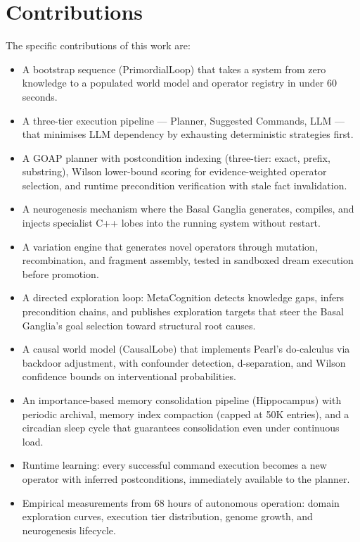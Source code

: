 \documentclass[12pt,a4paper]{report}
\begin{document}
\section{Contributions}
The specific contributions of this work are:
\begin{itemize}
    \item A bootstrap sequence (PrimordialLoop) that takes a system from zero knowledge to a populated world model and operator registry in under 60 seconds.
    \item A three-tier execution pipeline --- Planner, Suggested Commands, LLM --- that minimises LLM dependency by exhausting deterministic strategies first.
    \item A GOAP planner with postcondition indexing (three-tier: exact, prefix, substring), Wilson lower-bound scoring for evidence-weighted operator selection, and runtime precondition verification with stale fact invalidation.
    \item A neurogenesis mechanism where the Basal Ganglia generates, compiles, and injects specialist C++ lobes into the running system without restart.
    \item A variation engine that generates novel operators through mutation, recombination, and fragment assembly, tested in sandboxed dream execution before promotion.
    \item A directed exploration loop: MetaCognition detects knowledge gaps, infers precondition chains, and publishes exploration targets that steer the Basal Ganglia's goal selection toward structural root causes.
    \item A causal world model (CausalLobe) that implements Pearl's do-calculus via backdoor adjustment, with confounder detection, d-separation, and Wilson confidence bounds on interventional probabilities.
    \item An importance-based memory consolidation pipeline (Hippocampus) with periodic archival, memory index compaction (capped at 50K entries), and a circadian sleep cycle that guarantees consolidation even under continuous load.
    \item Runtime learning: every successful command execution becomes a new operator with inferred postconditions, immediately available to the planner.
    \item Empirical measurements from 68 hours of autonomous operation: domain exploration curves, execution tier distribution, genome growth, and neurogenesis lifecycle.
\end{itemize}
\end{document}
